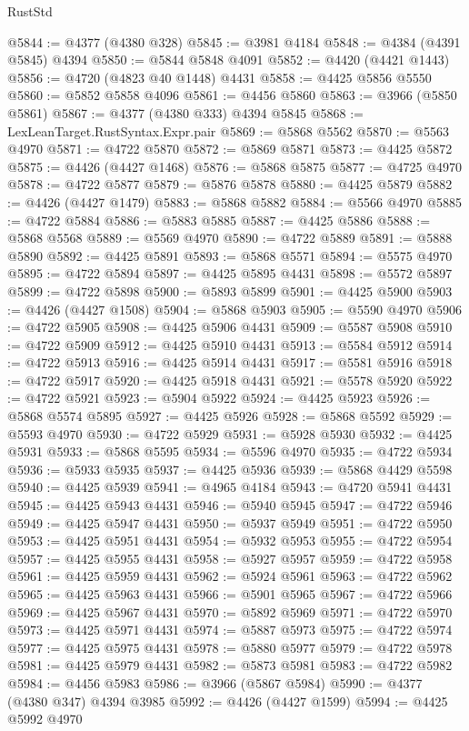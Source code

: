\begin{lexlean}{RustStd}
\begin{coremodule}
@5844 := @4377 (@4380 @328)
@5845 := @3981 @4184
@5848 := @4384 (@4391 @5845) @4394
@5850 := @5844 @5848 @4091
@5852 := @4420 (@4421 @1443)
@5856 := @4720 (@4823 @40 @1448) @4431
@5858 := @4425 @5856 @5550
@5860 := @5852 @5858 @4096
@5861 := @4456 @5860
@5863 := @3966 (@5850 @5861)
@5867 := @4377 (@4380 @333) @4394 @5845
@5868 := LexLeanTarget.RustSyntax.Expr.pair
@5869 := @5868 @5562
@5870 := @5563 @4970
@5871 := @4722 @5870
@5872 := @5869 @5871
@5873 := @4425 @5872
@5875 := @4426 (@4427 @1468)
@5876 := @5868 @5875
@5877 := @4725 @4970
@5878 := @4722 @5877
@5879 := @5876 @5878
@5880 := @4425 @5879
@5882 := @4426 (@4427 @1479)
@5883 := @5868 @5882
@5884 := @5566 @4970
@5885 := @4722 @5884
@5886 := @5883 @5885
@5887 := @4425 @5886
@5888 := @5868 @5568
@5889 := @5569 @4970
@5890 := @4722 @5889
@5891 := @5888 @5890
@5892 := @4425 @5891
@5893 := @5868 @5571
@5894 := @5575 @4970
@5895 := @4722 @5894
@5897 := @4425 @5895 @4431
@5898 := @5572 @5897
@5899 := @4722 @5898
@5900 := @5893 @5899
@5901 := @4425 @5900
@5903 := @4426 (@4427 @1508)
@5904 := @5868 @5903
@5905 := @5590 @4970
@5906 := @4722 @5905
@5908 := @4425 @5906 @4431
@5909 := @5587 @5908
@5910 := @4722 @5909
@5912 := @4425 @5910 @4431
@5913 := @5584 @5912
@5914 := @4722 @5913
@5916 := @4425 @5914 @4431
@5917 := @5581 @5916
@5918 := @4722 @5917
@5920 := @4425 @5918 @4431
@5921 := @5578 @5920
@5922 := @4722 @5921
@5923 := @5904 @5922
@5924 := @4425 @5923
@5926 := @5868 @5574 @5895
@5927 := @4425 @5926
@5928 := @5868 @5592
@5929 := @5593 @4970
@5930 := @4722 @5929
@5931 := @5928 @5930
@5932 := @4425 @5931
@5933 := @5868 @5595
@5934 := @5596 @4970
@5935 := @4722 @5934
@5936 := @5933 @5935
@5937 := @4425 @5936
@5939 := @5868 @4429 @5598
@5940 := @4425 @5939
@5941 := @4965 @4184
@5943 := @4720 @5941 @4431
@5945 := @4425 @5943 @4431
@5946 := @5940 @5945
@5947 := @4722 @5946
@5949 := @4425 @5947 @4431
@5950 := @5937 @5949
@5951 := @4722 @5950
@5953 := @4425 @5951 @4431
@5954 := @5932 @5953
@5955 := @4722 @5954
@5957 := @4425 @5955 @4431
@5958 := @5927 @5957
@5959 := @4722 @5958
@5961 := @4425 @5959 @4431
@5962 := @5924 @5961
@5963 := @4722 @5962
@5965 := @4425 @5963 @4431
@5966 := @5901 @5965
@5967 := @4722 @5966
@5969 := @4425 @5967 @4431
@5970 := @5892 @5969
@5971 := @4722 @5970
@5973 := @4425 @5971 @4431
@5974 := @5887 @5973
@5975 := @4722 @5974
@5977 := @4425 @5975 @4431
@5978 := @5880 @5977
@5979 := @4722 @5978
@5981 := @4425 @5979 @4431
@5982 := @5873 @5981
@5983 := @4722 @5982
@5984 := @4456 @5983
@5986 := @3966 (@5867 @5984)
@5990 := @4377 (@4380 @347) @4394 @3985
@5992 := @4426 (@4427 @1599)
@5994 := @4425 @5992 @4970

\end{coremodule}
\end{lexlean}
